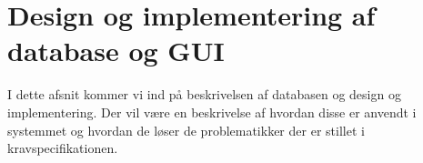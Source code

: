 \section{Design og implementering af database og GUI}
I dette afsnit kommer vi ind på beskrivelsen af databasen og  design og implementering. Der vil være en beskrivelse af hvordan disse er anvendt i systemmet og hvordan de løser de problematikker der er stillet i kravspecifikationen.\\






